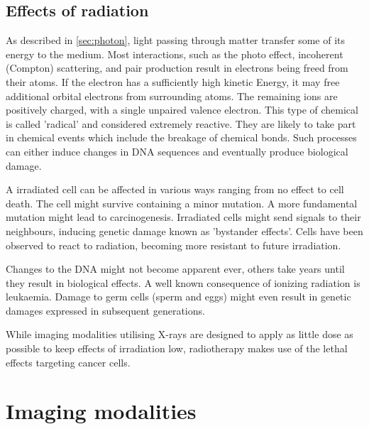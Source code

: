 \subsection{Effects of radiation}
\label{sec:irradiate}

As described in \ref{sec:photon}, light passing through matter transfer some of its energy to the medium.
Most interactions, such as the photo effect, incoherent (Compton) scattering, and pair production result in electrons being freed from their atoms.
If the electron has a sufficiently high kinetic Energy, it may free additional orbital electrons from surrounding atoms.
The remaining ions are positively charged, with a single unpaired valence electron.
This type of chemical is called 'radical' and considered extremely reactive.
They are likely to take part in chemical events which include the breakage of chemical bonds.
Such processes can either induce changes in DNA sequences and eventually produce biological damage.

A irradiated cell can be affected in various ways ranging from no effect to cell death.
The cell might survive containing a minor mutation.
A more fundamental mutation might lead to carcinogenesis.
Irradiated cells might send signals to their neighbours, inducing genetic damage known as 'bystander effects'.
Cells have been observed to react to radiation, becoming more resistant to future irradiation.

Changes to the DNA might not become apparent ever, others take years until they result in biological effects.
A well known consequence of ionizing radiation is leukaemia.
Damage to germ cells (sperm and eggs) might even result in genetic damages expressed in subsequent generations.

While imaging modalities utilising X-rays are designed to apply as little dose as possible to keep effects of irradiation low, radiotherapy makes use of the lethal effects targeting cancer cells. \cite{Podgorsak, Maidment2014}

\section{Imaging modalities}
